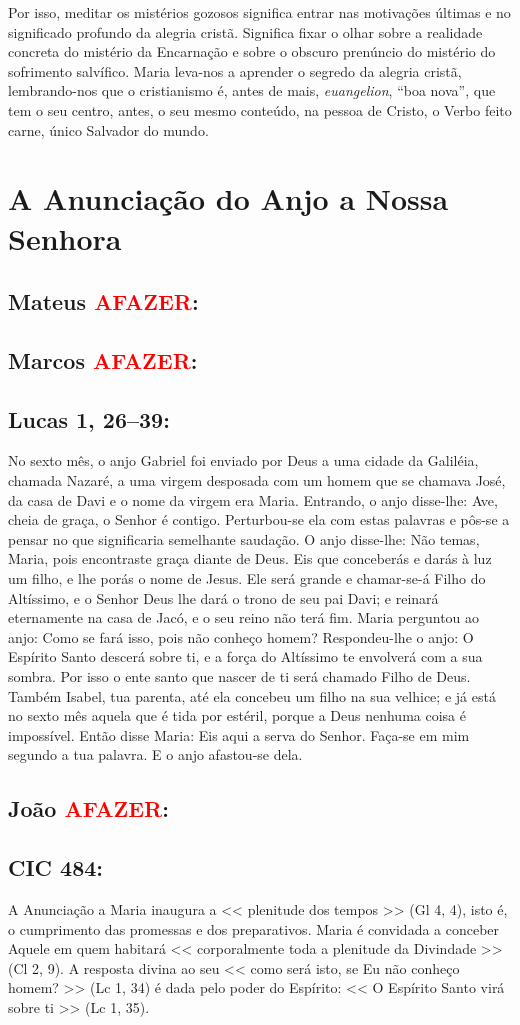 \documentclass[10pt,a5paper]{book}
\newcommand{\from}[1]{\subsection*{#1}}
\newcommand{\TODO}{\textcolor{red}{\ttfamily AFAZER}}
\begin{document}
Por isso, meditar os mistérios gozosos significa entrar nas motivações últimas e no significado profundo da alegria cristã.
Significa fixar o olhar sobre a realidade concreta do mistério da Encarnação e sobre o obscuro prenúncio do mistério do sofrimento salvífico.
Maria leva-nos a aprender o segredo da alegria cristã, lembrando-nos que o cristianismo é, antes de mais, \emph{euangelion}, ``boa nova'', que tem o seu centro, antes, o seu mesmo conteúdo, na pessoa de Cristo, o Verbo feito carne, único Salvador do mundo.


\section{A Anunciação do Anjo a Nossa Senhora}

\from{Mateus \TODO:}

\from{Marcos \TODO:}

\from{Lucas 1, 26--39:}

No sexto mês, o anjo Gabriel foi enviado por Deus a uma cidade da Galiléia, chamada Nazaré,
a uma virgem desposada com um homem que se chamava José, da casa de Davi e o nome da virgem era Maria.
Entrando, o anjo disse-lhe:
Ave, cheia de graça, o Senhor é contigo.
Perturbou-se ela com estas palavras e pôs-se a pensar no que significaria semelhante saudação.
O anjo disse-lhe:
Não temas, Maria, pois encontraste graça diante de Deus.
Eis que conceberás e darás à luz um filho, e lhe porás o nome de Jesus.
Ele será grande e chamar-se-á Filho do Altíssimo, e o Senhor Deus lhe dará o trono de seu pai Davi;
e reinará eternamente na casa de Jacó,
e o seu reino não terá fim.
Maria perguntou ao anjo:
Como se fará isso, pois não conheço homem?
Respondeu-lhe o anjo:
O Espírito Santo descerá sobre ti, e a força do Altíssimo te envolverá com a sua sombra.
Por isso o ente santo que nascer de ti será chamado Filho de Deus.
Também Isabel, tua parenta, até ela concebeu um filho na sua velhice;
e já está no sexto mês aquela que é tida por estéril,
porque a Deus nenhuma coisa é impossível.
Então disse Maria:
Eis aqui a serva do Senhor.
Faça-se em mim segundo a tua palavra.
E o anjo afastou-se dela.

\from{João \TODO:}

\from{CIC 484:}

A Anunciação a Maria inaugura a << plenitude dos tempos >> (Gl 4, 4), isto é, o cumprimento das promessas e dos preparativos.
Maria é convidada a conceber Aquele em quem habitará << corporalmente toda a plenitude da Divindade >> (Cl 2, 9).
A resposta divina ao seu << como será isto, se Eu não conheço homem? >> (Lc 1, 34) é dada pelo poder do Espírito:
<< O Espírito Santo virá sobre ti >> (Lc 1, 35).
\end{document}
